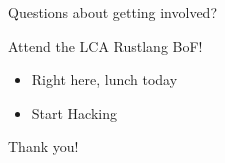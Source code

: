 \documentclass[aspectratio=169]{beamer}
\begin{document}
\begin{frame}
    \hfill Questions about getting involved?
\end{frame}

\begin{frame}
    Attend the LCA Rustlang BoF!
    \begin{itemize}
        \item Right here, lunch today
        \item Start Hacking
    \end{itemize}
\end{frame}

\begin{frame}

Thank you!

\end{frame}
%
%
\end{document}
